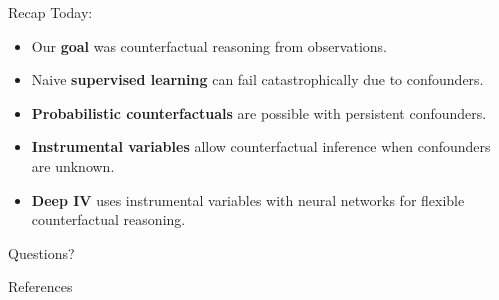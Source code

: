 \documentclass[xcolor={dvipsnames}]{beamer}
\begin{document}
    \begin{frame}{Recap}
        \large
        {\Large Today:}
        \begin{itemize}
            \item Our \textbf{goal} was counterfactual reasoning from observations.\vspace{0.2cm}
            \item Naive \textbf{supervised learning} can fail catastrophically due to confounders. \vspace{0.2cm}
            \item \textbf{Probabilistic counterfactuals} are possible with persistent confounders. \vspace{0.2cm}
            \item \textbf{Instrumental variables} allow counterfactual inference when confounders are unknown. \vspace{0.2cm}
            \item \textbf{Deep IV} uses instrumental variables with neural networks for flexible counterfactual reasoning.
        \end{itemize}
    \end{frame}

    \begin{frame}{Questions?}

        \begin{figure}
            \centering
            
        \end{figure}

    \end{frame}


    \begin{frame}[allowframebreaks]{References}
        
        
    \end{frame}
\end{document}
